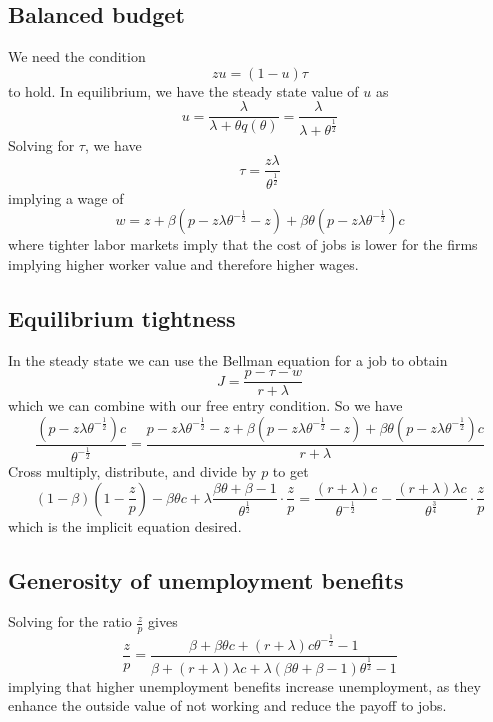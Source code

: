 \documentclass[11pt]{amsart}
\begin{document}
\subsection{Balanced budget}

We need the condition
\[
zu = (1-u) \tau
\]
to hold. In equilibrium, we have the steady state value of $u$ as
\[
u = \frac{\lambda}{\lambda + \theta q (\theta)} =  \frac{\lambda}{\lambda + \theta^{\frac{1}{2}}}
\]
Solving for $\tau$, we have
\begin{equation}
\tau = \frac{z \lambda}{\theta^{\frac{1}{2}}}
\end{equation}
implying a wage of 
\begin{equation}
w = z + \beta(p- z \lambda \theta^{-\frac{1}{2}}-z) + \beta \theta (p -  z \lambda \theta^{-\frac{1}{2}}) c
\end{equation}
where tighter labor markets imply that the cost of jobs is lower for the firms implying higher worker value and therefore higher wages.

\subsection{Equilibrium tightness}

In the steady state we can use the Bellman equation for a job to obtain
\[
J = \frac{p - \tau - w}{r + \lambda}
\]
which we can combine with our free entry condition. 
So we have
\[
\frac{(p-z\lambda \theta^{-\frac{1}{2}})c}{\theta^{-\frac{1}{2}}} = \frac{p - z\lambda \theta^{-\frac{1}{2}} - z + \beta(p- z \lambda \theta^{-\frac{1}{2}}-z) + \beta \theta (p -  z \lambda \theta^{-\frac{1}{2}}) c}{r + \lambda}
\]
Cross multiply, distribute, and divide by $p$ to get
\[
(1-\beta)(1- \frac{z}{p}) - \beta \theta c + \lambda  \frac{\beta \theta + \beta - 1}{\theta^{\frac{1}{2}}} \cdot \frac{z}{p} = \frac{(r+\lambda)c}{\theta^{-\frac{1}{2}}} - \frac{(r+\lambda) \lambda c}{\theta^{\frac{3}{4}}} \cdot \frac{z}{p}
\]
which is the implicit equation desired.

\subsection{Generosity of unemployment benefits}

Solving for the ratio $\frac{z}{p}$ gives
\[
\frac{z}{p} = \frac{ \beta + \beta \theta c + (r+\lambda)c \theta^{-\frac{1}{2}} - 1}{\beta + (r+\lambda) \lambda c + \lambda  (\beta \theta + \beta - 1) \theta^{\frac{1}{2}} -1 }
\]
implying that higher unemployment benefits increase unemployment, as they enhance the outside value of not working and reduce the payoff to jobs.
\end{document}
